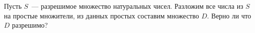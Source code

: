 Пусть $S$~--- разрешимое множество натуральных чисел. Разложим все числа из $S$ на простые множители, из данных простых
составим множество $D$. Верно ли что $D$ разрешимо?